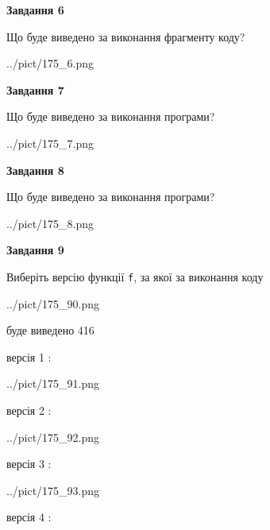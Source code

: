 \documentclass[12pt, ukrainian]{article}
\def\code#1{\Verb!#1!}
\begin{document}
{\begin {large}
{\begin {center}\textbf{Завдання 6}\end {center}}

Що буде виведено за виконання фрагменту коду?\par
\begin{center}
	{../pict/175_6.png}
\end{center}
\newpage

{\begin {center}\textbf{Завдання 7}\end {center}}

Що буде виведено за виконання програми?\par
\begin{center}
	{../pict/175_7.png}
\end{center}
\newpage

{\begin {center}\textbf{Завдання 8}\end {center}}

Що буде виведено за виконання програми?\par
\begin{center}
	{../pict/175_8.png}
\end{center}
\newpage

{\begin {center}\textbf{Завдання 9}\end {center}}

Виберіть версію функції \code{f}, за якої за виконання коду
\begin{center}
	{../pict/175_90.png}
\end{center}
буде виведено 416

\vspace{5mm}
версія 1 :

\begin{center}
	{../pict/175_91.png}
\end{center}
версія 2 :

\begin{center}
	{../pict/175_92.png}
\end{center}
версія 3 :

\begin{center}
	{../pict/175_93.png}
\end{center}
версія 4 :


\end{large}}
\end{document}
